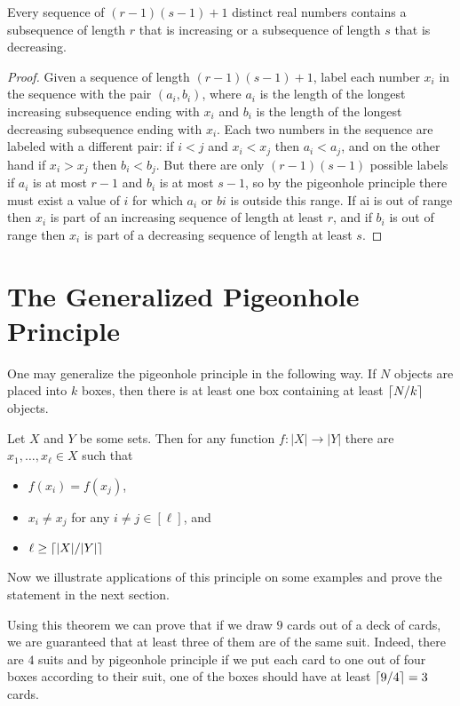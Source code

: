 \begin{theorem}
  Every sequence of $(r - 1)(s - 1) + 1$ distinct real numbers contains a
  subsequence of length $r$ that is increasing or a
  subsequence of length $s$ that is decreasing.
\end{theorem}
\begin{proof}
  Given a sequence of length $(r - 1)(s - 1) + 1$, label each number $x_i$ in
  the sequence with the pair $(a_i, b_i)$, where $a_i$ is the length of the
  longest increasing subsequence ending with $x_i$ and $b_i$ is
  the length of the longest decreasing subsequence ending with $x_i$.
  Each two numbers in the sequence are labeled with a different pair: if $i < j$
  and $x_i < x_j$ then $a_i < a_j$, and on the other hand if $x_i > x_j$ then
  $b_i < b_j$. But there are only $(r - 1)(s - 1)$ possible labels if $a_i$ is
  at most $r - 1$ and $b_i$ is at most $s - 1$, so by the pigeonhole principle
  there must exist a value of $i$ for which $a_i$ or $bi$ is outside this
  range. If ai is out of range then $x_i$ is part of an increasing sequence of
  length at least $r$, and if $b_i$ is out of range then $x_i$ is part of a
  decreasing sequence of length at least $s$.
\end{proof}

\section{The Generalized Pigeonhole Principle}
One may generalize the pigeonhole principle in the following way.
If $N$ objects are placed into $k$ boxes, then there is at least one box
containing at least $\left\lceil {N / k} \right\rceil$ objects.
\begin{theorem}
\label{theorem:generalized-pigeonhole-principle}
  Let $X$ and $Y$ be some sets. Then for any function $f : |X| \to |Y|$ there
  are $x_1, \dots, x_\ell \in X$ such that
  \begin{itemize}
    \item $f(x_i) = f(x_j)$,
    \item $x_i \neq x_j$ for any $i \neq j \in [\ell]$, and
    \item $\ell \ge \left\lceil {|X| / |Y|} \right\rceil$
  \end{itemize}
\end{theorem}

Now we illustrate applications of this principle on some examples and prove the
statement in the next section.

Using this theorem we can prove that if we draw $9$ cards out of a deck of
cards, we are guaranteed that at least three of them are of the same suit.
Indeed, there are $4$ suits and by pigeonhole principle if we put each card to
one out of four boxes according to their suit, one of the boxes should have
at least $\left\lceil {9 / 4} \right\rceil = 3$ cards.

